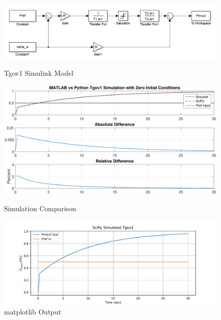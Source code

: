 \documentclass[12pt]{article}
\begin{document}
	\begin{figure}[ht!]
		\begin{center}
		\includegraphics[width=\linewidth]{tgov1_simulink_model}
		\caption{Tgov1 Simulink Model}
		\label{tgov1}		 

		\includegraphics[width=\linewidth]{pyMATcomparision}  
		\caption{Simulation Comparison}
		\label{matcomp}
			
		\includegraphics[width=\linewidth]{matplotlibTgov1}  
		\caption{matplotlib Output}
		\label{matcomp}
			\end{center}
		\end{figure}

\pagebreak
\end{document}
